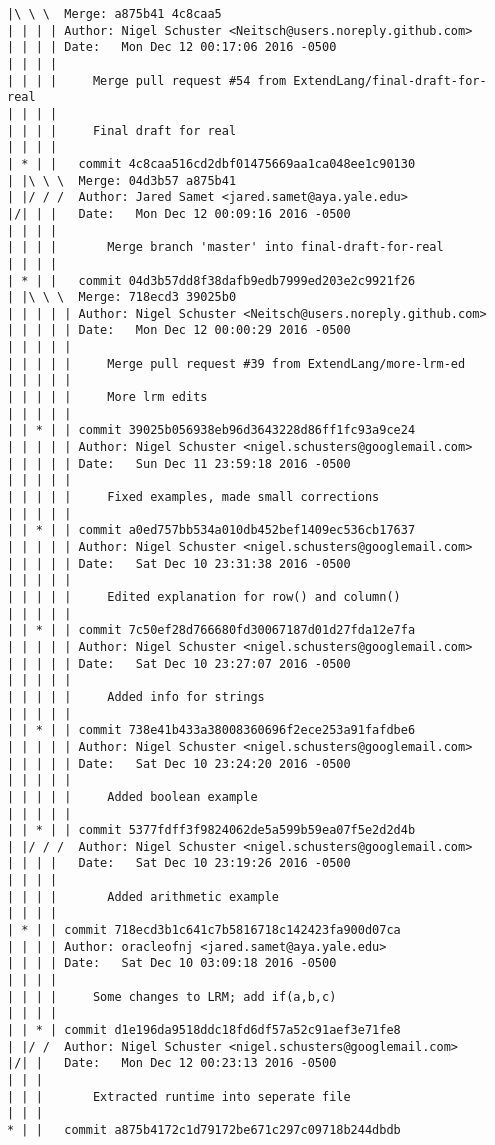 \begin{lstlisting}
|\ \ \  Merge: a875b41 4c8caa5
| | | | Author: Nigel Schuster <Neitsch@users.noreply.github.com>
| | | | Date:   Mon Dec 12 00:17:06 2016 -0500
| | | | 
| | | |     Merge pull request #54 from ExtendLang/final-draft-for-real
| | | |     
| | | |     Final draft for real
| | | |       
| * | |   commit 4c8caa516cd2dbf01475669aa1ca048ee1c90130
| |\ \ \  Merge: 04d3b57 a875b41
| |/ / /  Author: Jared Samet <jared.samet@aya.yale.edu>
|/| | |   Date:   Mon Dec 12 00:09:16 2016 -0500
| | | |   
| | | |       Merge branch 'master' into final-draft-for-real
| | | |       
| * | |   commit 04d3b57dd8f38dafb9edb7999ed203e2c9921f26
| |\ \ \  Merge: 718ecd3 39025b0
| | | | | Author: Nigel Schuster <Neitsch@users.noreply.github.com>
| | | | | Date:   Mon Dec 12 00:00:29 2016 -0500
| | | | | 
| | | | |     Merge pull request #39 from ExtendLang/more-lrm-ed
| | | | |     
| | | | |     More lrm edits
| | | | |      
| | * | | commit 39025b056938eb96d3643228d86ff1fc93a9ce24
| | | | | Author: Nigel Schuster <nigel.schusters@googlemail.com>
| | | | | Date:   Sun Dec 11 23:59:18 2016 -0500
| | | | | 
| | | | |     Fixed examples, made small corrections
| | | | |      
| | * | | commit a0ed757bb534a010db452bef1409ec536cb17637
| | | | | Author: Nigel Schuster <nigel.schusters@googlemail.com>
| | | | | Date:   Sat Dec 10 23:31:38 2016 -0500
| | | | | 
| | | | |     Edited explanation for row() and column()
| | | | |      
| | * | | commit 7c50ef28d766680fd30067187d01d27fda12e7fa
| | | | | Author: Nigel Schuster <nigel.schusters@googlemail.com>
| | | | | Date:   Sat Dec 10 23:27:07 2016 -0500
| | | | | 
| | | | |     Added info for strings
| | | | |      
| | * | | commit 738e41b433a38008360696f2ece253a91fafdbe6
| | | | | Author: Nigel Schuster <nigel.schusters@googlemail.com>
| | | | | Date:   Sat Dec 10 23:24:20 2016 -0500
| | | | | 
| | | | |     Added boolean example
| | | | |      
| | * | | commit 5377fdff3f9824062de5a599b59ea07f5e2d2d4b
| |/ / /  Author: Nigel Schuster <nigel.schusters@googlemail.com>
| | | |   Date:   Sat Dec 10 23:19:26 2016 -0500
| | | |   
| | | |       Added arithmetic example
| | | |     
| * | | commit 718ecd3b1c641c7b5816718c142423fa900d07ca
| | | | Author: oracleofnj <jared.samet@aya.yale.edu>
| | | | Date:   Sat Dec 10 03:09:18 2016 -0500
| | | | 
| | | |     Some changes to LRM; add if(a,b,c)
| | | |     
| | * | commit d1e196da9518ddc18fd6df57a52c91aef3e71fe8
| |/ /  Author: Nigel Schuster <nigel.schusters@googlemail.com>
|/| |   Date:   Mon Dec 12 00:23:13 2016 -0500
| | |   
| | |       Extracted runtime into seperate file
| | |      
* | |   commit a875b4172c1d79172be671c297c09718b244dbdb

\end{lstlisting}
